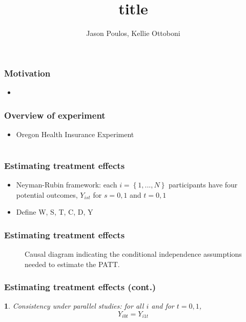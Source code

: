\documentclass{beamer}
\title[]{title}
\author[J. Poulos, K. Ottoboni]{Jason Poulos, Kellie Ottoboni}
\date[04/30/15]{}
\makeatletter
\newtheorem*{assumption*}{\assumptionnumber}
\providecommand{\assumptionnumber}{}
\newenvironment{assumption}[2]
 {%
  \renewcommand{\assumptionnumber}{Assumption #1}%
  \begin{assumption*}%
  \protected@edef\@currentlabel{#1}%
 }
 {%
  \end{assumption*}
 }
\makeatother
\begin{document}
\frame{\titlepage}

\section[Introduction]{}

\begin{frame}
\frametitle{Motivation}
\begin{itemize}
\item 
\end{itemize}
\end{frame}

\begin{frame}
\frametitle{Overview of experiment}
\begin{itemize}
\item Oregon Health Insurance Experiment
\end{itemize}
\end{frame}

\section[Estimation]{}

\begin{frame}
\frametitle{Estimating treatment effects}
\begin{itemize}
\item Neyman-Rubin framework: each $i = \left\{1, ..., N \right\}$ participants have four potential outcomes, $Y_{ist}$ for $s = 0,1$ and $t = 0,1$
\item Define W, S, T, C, D, Y
\end{itemize}
\end{frame}


\begin{frame}
\frametitle{Estimating treatment effects}
\begin{figure}[h]
\centering
{}
\caption{Causal diagram indicating the conditional independence assumptions needed to estimate the PATT.}\label{fig:DAG}
\end{figure}

\end{frame}

\begin{frame}
\frametitle{Estimating treatment effects (cont.)}
\begin{assumption}{1}{}\label{consistency}
Consistency under parallel studies: for all $i$ and for $t=0, 1$,
$$Y_{i0t} = Y_{i1t}$$
\end{assumption}
\end{frame}
\end{document}
